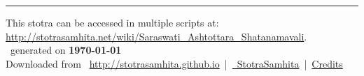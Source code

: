 \documentclass[oneside,12pt]{book}
\begin{document}
\setmainfont[Script=Devanagari,Mapping=tex-text]{Sanskrit 2003}
\fontsize {16}{19.25}\selectfont
\begin{center}

\end{center}
\vfill
\centering
\rule{0.8\textwidth}{0.6pt}

\footnotesize
{}\sffamily
This stotra can be accessed in multiple scripts at:\\
\url{http://stotrasamhita.net/wiki/Saraswati_Ashtottara_Shatanamavali}.\\[1ex]
\faFilePdfO~generated on \textbf{\today}\\[1ex]
Downloaded from \faGlobe{}~\url{http://stotrasamhita.github.io}~|~\href{https://github.com/StotraSamhita}{\faGithubSquare{}~StotraSamhita}~|~\href{https://stotrasamhita.github.io/about/}{Credits}
\end{document}
